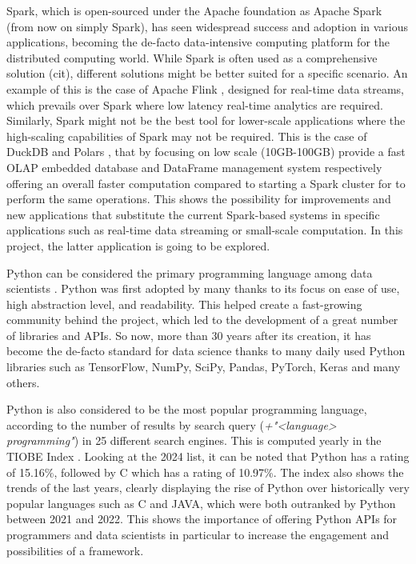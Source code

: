 Spark, which is open-sourced under the Apache foundation as Apache Spark \cite{ApacheSparkUnified} (from now on simply Spark), has seen widespread success and adoption in various applications, becoming the de-facto data-intensive computing platform for the distributed computing world. While Spark is often used as a comprehensive solution (cit), different solutions might be better suited for a specific scenario. An example of this is the case of Apache Flink \cite{carboneApacheFlinkStream}, designed for real-time data streams, which prevails over Spark where low latency real-time analytics are required. Similarly, Spark might not be the best tool for lower-scale applications where the high-scaling capabilities of Spark may not be required. This is the case of DuckDB \cite{raasveldtDuckDBEmbeddableAnalytical2019} and Polars \cite{vinkWroteOneFastest2021}, that by focusing on low scale (10GB-100GB) provide a fast \gls{OLAP} embedded database and DataFrame management system respectively offering an overall faster computation compared to starting a Spark cluster for to perform the same operations. This shows the possibility for improvements and new applications that substitute the current Spark-based systems in specific applications such as real-time data streaming or small-scale computation. In this project, the latter application is going to be explored.

Python can be considered the primary programming language among data scientists \cite{Python_CS-R9526}. Python was first adopted by many thanks to its focus on ease of use, high abstraction level, and readability. This helped create a fast-growing community behind the project, which led to the development of a great number of libraries and \glspl{API}. So now, more than 30 years after its creation, it has become the de-facto standard for data science thanks to many daily used Python libraries such as TensorFlow, NumPy, SciPy, Pandas, PyTorch, Keras and many others.

Python is also considered to be the most popular programming language, according to the number of results by search query (\textit{+"<language> programming"}) in 25 different search engines. This is computed yearly in the TIOBE Index \cite{TIOBEIndex}. Looking at the 2024 list, it can be noted that Python has a rating of 15.16\%, followed by C which has a rating of 10.97\%. The index also shows the trends of the last years, clearly displaying the rise of Python over historically very popular languages such as C and JAVA, which were both outranked by Python between 2021 and 2022. This shows the importance of offering Python \glspl{API} for programmers and data scientists in particular to increase the engagement and possibilities of a framework.